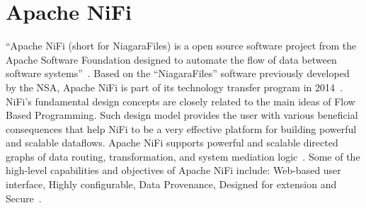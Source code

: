 \section{Apache NiFi}
``Apache NiFi (short for NiagaraFiles) is a open source software project from the Apache Software 
Foundation designed to automate the flow of data between software 
systems''~\cite{hid-sp18-405-wiki-nifi}. Based on the ``NiagaraFiles'' software previously developed by 
the NSA,  Apache NiFi is part of its technology transfer program in 2014~\cite{hid-sp18-405-wiki-nifi}. 
NiFi's fundamental design concepts are closely related to the main ideas of Flow Based Programming. 
Such design model provides the user with various beneficial consequences that help NiFi to be a very 
effective platform for building powerful and scalable dataflows. Apache NiFi supports powerful and 
scalable directed graphs of data routing, transformation, and system mediation 
logic~\cite{hid-sp18-405-wwwoverview-nifi}. Some of the high-level capabilities and objectives of 
Apache NiFi include: Web-based user interface, Highly configurable, Data Provenance, Designed for 
extension and Secure~\cite{hid-sp18-405-www-nifi}.
